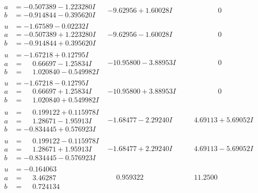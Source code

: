 \documentclass[1p]{elsarticle_modified}
\theoremstyle{definition}
\begin{document}
$$\begin{array}{c|c|c}
\begin{aligned}
a &= -0.507389 - 1.223280 I \\
b &= -0.914844 - 0.395620 I\end{aligned}
 & -9.62956 + 1.60028 I & \phantom{-0.000000 } 0 \\ \hline\begin{aligned}
u &= -1.67589 - 0.02232 I \\
a &= -0.507389 + 1.223280 I \\
b &= -0.914844 + 0.395620 I\end{aligned}
 & -9.62956 - 1.60028 I & \phantom{-0.000000 } 0 \\ \hline\begin{aligned}
u &= -1.67218 + 0.12795 I \\
a &= \phantom{-}0.66697 - 1.25834 I \\
b &= \phantom{-}1.020840 - 0.549982 I\end{aligned}
 & -10.95800 - 3.88953 I & \phantom{-0.000000 } 0 \\ \hline\begin{aligned}
u &= -1.67218 - 0.12795 I \\
a &= \phantom{-}0.66697 + 1.25834 I \\
b &= \phantom{-}1.020840 + 0.549982 I\end{aligned}
 & -10.95800 + 3.88953 I & \phantom{-0.000000 } 0 \\ \hline\begin{aligned}
u &= \phantom{-}0.199122 + 0.115978 I \\
a &= \phantom{-}1.28671 - 1.95913 I \\
b &= -0.834445 + 0.576923 I\end{aligned}
 & -1.68477 - 2.29240 I & \phantom{-}4.69113 + 5.69052 I \\ \hline\begin{aligned}
u &= \phantom{-}0.199122 - 0.115978 I \\
a &= \phantom{-}1.28671 + 1.95913 I \\
b &= -0.834445 - 0.576923 I\end{aligned}
 & -1.68477 + 2.29240 I & \phantom{-}4.69113 - 5.69052 I \\ \hline\begin{aligned}
u &= -0.164063\phantom{ +0.000000I} \\
a &= \phantom{-}3.46287\phantom{ +0.000000I} \\
b &= \phantom{-}0.724134\phantom{ +0.000000I}\end{aligned}
 & \phantom{-}0.959322\phantom{ +0.000000I} & \phantom{-}11.2500\phantom{ +0.000000I} \\ \hline\begin{aligned}

\end{aligned}
\end{array}$$
\end{document}

